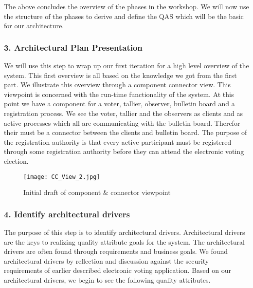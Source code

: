 \noindent
The above concludes the overview of the phases in the workshop. We will now use the structure of the phases to derive and define the QAS which will be the basic for our architecture. 

\subsubsection{3. Architectural Plan Presentation}
We will use this step to wrap up our first iteration for a high level overview of the system. This first overview is all based on the knowledge we got from the first part. We illustrate this overview through a component connector view. This viewpoint is concerned with the run-time functionality of the system.  At this point we have a component for a voter, tallier, observer, bulletin board and a registration process. We see the voter, tallier and the observers as clients and as active processes which all are communicating with the bulletin board. Therefor their must be a connector between the clients and bulletin board. The purpose of the registration authority is that every active participant must be registered through some registration authority before they can attend the electronic voting election. 

\begin{figure}[H]
\centering
     \texttt{[image: CC\_View\_2.jpg]}
     \caption{Initial draft of component \& connector viewpoint}     
\end{figure}
 


\subsubsection{4. Identify architectural drivers}
The purpose of this step is to identify architectural drivers. Architectural drivers are the keys to realizing quality attribute goals for the system. The architectural drivers are often found through requirements and business goals. We found architectural drivers by reflection and discussion against the security requirements of earlier described electronic voting application. Based on our architectural drivers, we begin to see the following quality attributes.\\



